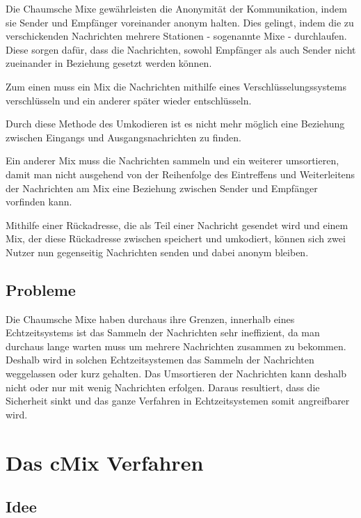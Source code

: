 \documentclass[
    fontsize=12pt,
    headings=small,
    parskip=half,           %
    bibliography=totoc,
    numbers=noenddot,       %
    open=any,               %
    ]{scrreprt}
\begin{document}
Die Chaumsche Mixe gewährleisten die Anonymität der
Kommunikation, indem sie Sender und Empfänger voreinander anonym halten. 
Dies
gelingt, indem die zu verschickenden Nachrichten mehrere Stationen - sogenannte
Mixe - durchlaufen. Diese sorgen dafür, dass die Nachrichten, sowohl Empfänger als
auch Sender nicht zueinander in Beziehung gesetzt werden können.

Zum einen muss ein Mix die Nachrichten mithilfe eines Verschlüsselungssystems verschlüsseln und ein anderer
später wieder entschlüsseln. 

Durch diese Methode des Umkodieren ist es nicht mehr
möglich eine Beziehung zwischen Eingangs und Ausgangsnachrichten zu finden. 

Ein anderer Mix muss die Nachrichten sammeln und ein weiterer umsortieren, damit
man nicht ausgehend von der Reihenfolge des Eintreffens und Weiterleitens der
Nachrichten am Mix eine Beziehung zwischen Sender und Empfänger vorfinden
kann. 

Mithilfe einer Rückadresse, die als Teil einer Nachricht gesendet wird und
einem Mix, der diese Rückadresse zwischen speichert und umkodiert, können sich
zwei Nutzer nun gegenseitig Nachrichten senden und dabei anonym bleiben.  \cite{Chaum:1981:UEM:358549.358563} \cite{sampigethaya2006survey}

\section{Probleme}

Die Chaumsche Mixe haben durchaus ihre Grenzen, innerhalb eines Echtzeitsystems
ist das Sammeln der Nachrichten sehr ineffizient, da man durchaus lange warten
muss um mehrere Nachrichten zusammen zu bekommen. Deshalb wird in solchen
Echtzeitsystemen das Sammeln der Nachrichten weggelassen oder kurz gehalten.
Das Umsortieren der Nachrichten kann deshalb nicht oder nur mit wenig Nachrichten
erfolgen. Daraus resultiert, dass die Sicherheit sinkt und das ganze Verfahren in
Echtzeitsystemen somit angreifbarer wird. \cite{Chaum:1981:UEM:358549.358563} \cite{sampigethaya2006survey}

\chapter{Das cMix Verfahren}

\section{Idee}
\end{document}
